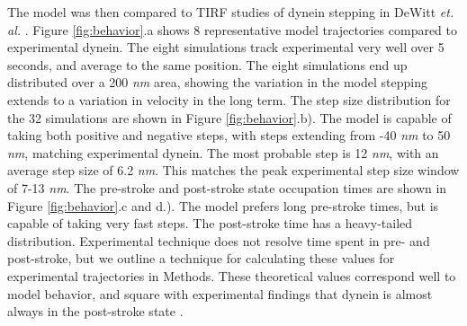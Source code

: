 \documentclass[9pt,twocolumn,twoside]{article}
\begin{document}
The model was then compared to TIRF studies of dynein stepping in DeWitt \textit{et. al.} \cite{yildizpaper}. Figure \ref{fig:behavior}.a shows 8 representative model trajectories compared to experimental dynein. The eight simulations track experimental very well over 5 seconds, and average to the same position. The eight simulations end up distributed over a 200 \textit{nm} area, showing the variation in the model stepping extends to a variation in velocity in the long term. The step size distribution for the 32 simulations are shown in Figure \ref{fig:behavior}.b). The model is capable of taking both positive and negative steps, with steps extending from -40 \textit{nm} to 50 \textit{nm}, matching experimental dynein. The most probable step is 12 \textit{nm}, with an average step size of 6.2 \textit{nm}. This matches the peak experimental step size window of 7-13 \textit{nm}. The pre-stroke and post-stroke state occupation times are shown in Figure \ref{fig:behavior}.c and d.). The model prefers long pre-stroke times, but is capable of taking very fast steps. The post-stroke time has a heavy-tailed distribution. Experimental technique does not resolve time spent in pre- and post-stroke, but we outline a technique for calculating these values for experimental trajectories in Methods. These theoretical values correspond well to model behavior, and square with experimental findings that dynein is almost always in the post-stroke state \cite{imaiburgess}.

\end{document}
